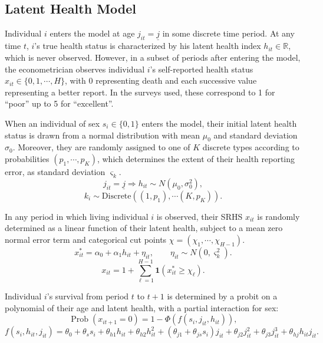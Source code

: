 \documentclass[12pt,pdftex,letterpaper]{article}
\newcommand{\Prob}{\operatorname{Prob}}
\newcommand{\R}{\mathbb{R}}
\newcommand{\Health}{h}
\newcommand{\TopHealth}{H}
\newcommand{\Report}{x}
\newcommand{\Age}{j}
\newcommand{\Sex}{s}
\newcommand{\AgeMin}{\underline{\Age}}
\newcommand{\HealthInitMean}{\mu_0}
\newcommand{\HealthInitStd}{\sigma_0}
\newcommand{\Cut}{\chi}
\newcommand{\MortParam}{\theta}
\newcommand{\LatentParam}{\alpha}
\newcommand{\ReportShock}{\eta}
\newcommand{\TypeProb}{p}
\newcommand{\ReportStd}{\varsigma}
\begin{document}
\subsection{Latent Health Model}\label{sec:Model}

Individual $i$ enters the model at age $\Age_{it}=\AgeMin$ in some discrete time period.  At any time $t$, $i$'s true health status is characterized by his latent health index  $\Health_{it} \in \R$, which is never observed.  However, in a subset of periods after entering the model, the econometrician observes individual $i$'s self-reported health status $\Report_{it} \in \{0,1,\cdots,\TopHealth\}$, with $0$ representing death and each successive value representing a better report.  In the surveys used, these correspond to 1 for ``poor'' up to 5 for ``excellent''.

When an individual of sex $\Sex_i \in \{0,1\}$ enters the model, their initial latent health status is drawn from a normal distribution with mean $\HealthInitMean$ and standard deviation $\HealthInitStd$. Moreover, they are randomly assigned to one of $K$ discrete types according to probabilities $(\TypeProb_1,\cdots,\TypeProb_K)$, which determines the extent of their health reporting error, as standard deviation $\ReportStd_k$.
\begin{equation}\label{HealthInit}
\Age_{it}=\AgeMin \Longrightarrow \Health_{it} \sim N(\HealthInitMean, \HealthInitStd^2),
\end{equation}
\begin{equation*}
k_i \sim \text{Discrete}\left((1,\TypeProb_1),\cdots (K,\TypeProb_K) \right).
\end{equation*}


In any period in which living individual $i$ is observed, their SRHS $\Report_{it}$ is randomly determined as a linear function of their latent health, subject to a mean zero normal error term and categorical cut points $\Cut = (\Cut_1, \cdots, \Cut_{\TopHealth-1})$.
\begin{equation}\label{Report}
\Report^*_{it} = \LatentParam_0 + \LatentParam_1 \Health_{it} + \ReportShock_{it}, \qquad \ReportShock_{it} \sim N(0,\ReportStd_k^2). 
\end{equation}
\begin{equation}
\Report_{it} = 1 + \sum_{\ell = 1}^{\TopHealth-1} \mathbf{1}(\Report^*_{it} \geq \Cut_\ell).
\end{equation}

Individual $i$'s survival from period $t$ to $t+1$ is determined by a probit on a polynomial of their age and latent health, with a partial interaction for sex:
\begin{equation}\label{Mortality}
\Prob(\Report_{it+1} = 0) = 1 - \Phi(f(\Sex_i,\Age_{it}, \Health_{it})),
\end{equation}
\begin{equation*}
f(\Sex_i,\Health_{it}, \Age_{it}) = \MortParam_0 + \MortParam_\Sex \Sex_i + \MortParam_{\Health1} \Health_{it} + \MortParam_{\Health2} \Health_{it}^2 + (\MortParam_{\Age1} + \MortParam_{\Age\Sex}\Sex_i) \Age_{it} + \MortParam_{\Age2} \Age_{it}^2 + \MortParam_{\Age3} \Age_{it}^3 + \MortParam_{\Health \Age} \Health_{it} \Age_{it}.
\end{equation*}
\end{document}
